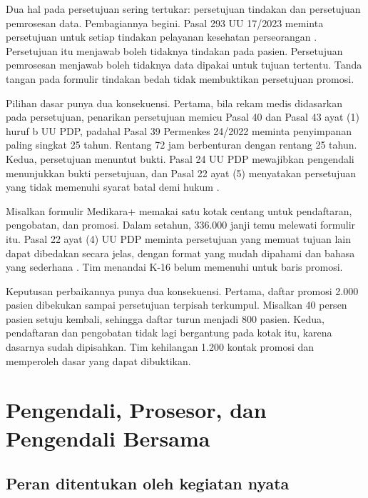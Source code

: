 Dua hal pada persetujuan sering tertukar: persetujuan tindakan dan persetujuan pemrosesan data.
Pembagiannya begini. Pasal 293 UU 17/2023 meminta persetujuan untuk setiap tindakan pelayanan
kesehatan perseorangan \cite{c03-uu17}. Persetujuan itu menjawab boleh tidaknya tindakan pada
pasien. Persetujuan pemrosesan menjawab boleh tidaknya data dipakai untuk tujuan tertentu. Tanda
tangan pada formulir tindakan bedah tidak membuktikan persetujuan promosi.

Pilihan dasar punya dua konsekuensi. Pertama, bila rekam medis didasarkan pada persetujuan,
penarikan persetujuan memicu Pasal 40 dan Pasal 43 ayat (1) huruf b UU PDP, padahal Pasal 39
Permenkes 24/2022 meminta penyimpanan paling singkat 25 tahun. Rentang 72 jam berbenturan dengan
rentang 25 tahun. Kedua, persetujuan menuntut bukti. Pasal 24 UU PDP mewajibkan pengendali
menunjukkan bukti persetujuan, dan Pasal 22 ayat (5) menyatakan persetujuan yang tidak memenuhi
syarat batal demi hukum \cite{uu27-2022-pdp,permenkes24-2022}.

\begin{kasus}[title={Kasus Medikara Health: Satu Kotak untuk Tiga Tujuan}]
Misalkan formulir Medikara+ memakai satu kotak centang untuk pendaftaran, pengobatan, dan promosi.
Dalam setahun, 336.000 janji temu melewati formulir itu. Pasal 22 ayat (4) UU PDP meminta
persetujuan yang memuat tujuan lain dapat dibedakan secara jelas, dengan format yang mudah dipahami
dan bahasa yang sederhana \cite{uu27-2022-pdp}. Tim menandai K-16 belum memenuhi untuk baris
promosi.

Keputusan perbaikannya punya dua konsekuensi. Pertama, daftar promosi 2.000 pasien dibekukan sampai
persetujuan terpisah terkumpul. Misalkan 40 persen pasien setuju kembali, sehingga daftar turun
menjadi 800 pasien. Kedua, pendaftaran dan pengobatan tidak lagi bergantung pada kotak itu, karena
dasarnya sudah dipisahkan. Tim kehilangan 1.200 kontak promosi dan memperoleh dasar yang dapat
dibuktikan.
\end{kasus}

\section{Pengendali, Prosesor, dan Pengendali Bersama}

\subsection*{Peran ditentukan oleh kegiatan nyata}

